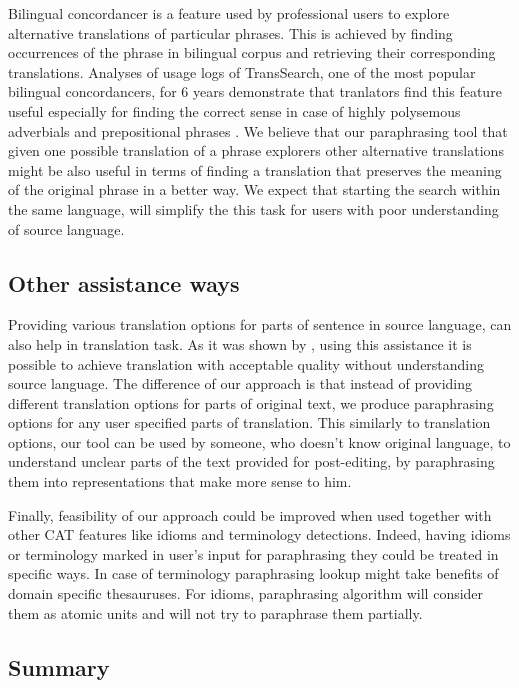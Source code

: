 Bilingual concordancer is a feature used by professional users to explore alternative translations of particular phrases. This is achieved by finding occurrences of the phrase in bilingual corpus and retrieving their corresponding translations. Analyses of usage logs of TransSearch, one of the most popular bilingual concordancers, for 6 years demonstrate that tranlators find this feature useful especially for finding the correct sense in case of highly polysemous adverbials and prepositional phrases \cite{Macklovitch2008}. We believe that our paraphrasing tool that given one possible translation of a phrase explorers other alternative translations might be also useful in terms of finding a translation that preserves the meaning of the original phrase in a better way. We expect that starting the search within the same language, will simplify the this task for users with poor understanding of source language.


\subsection{Other assistance ways}

Providing various translation options for parts of sentence in source language, can also help in translation task. As it was shown by \cite{Koehn2010}, using this assistance it is possible to achieve translation with acceptable quality without understanding source language. The difference of our approach is that instead of providing different translation options for parts of original text, we produce paraphrasing options for any user specified parts of translation. This similarly to translation options, our tool can be used by someone, who doesn't know original language, to understand unclear parts of the text provided for post-editing, by paraphrasing them into representations that make more sense to him.

Finally, feasibility of our approach could be improved when used together with other CAT features like idioms and terminology detections. Indeed, having idioms or terminology marked in user's input for paraphrasing they could be treated in specific ways. In case of terminology paraphrasing lookup might take benefits of domain specific thesauruses. For idioms, paraphrasing algorithm will consider them as atomic units and will not try to paraphrase them partially. 

\subsection{Summary}

